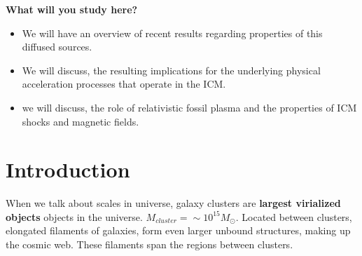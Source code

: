 \documentclass[12pt]{report}
\begin{document}
\textbf{What will you study here?}\\
\begin{itemize}
\item We will have an overview of recent results regarding properties of this diffused sources.
\item We will discuss, the resulting implications for the underlying physical acceleration processes that operate in the ICM.
\item we will discuss, the role of relativistic fossil plasma and the properties of ICM shocks and magnetic fields.
\end{itemize}
\newpage
\section{Introduction}
When we talk about scales in universe, galaxy clusters are \textbf{largest virialized objects} objects in the universe. $M_{cluster}=\sim 10^{15} M_\odot$. Located between clusters, elongated filaments of galaxies, form even larger unbound structures, making up the cosmic web. These filaments span the regions between clusters. 
\end{document}
